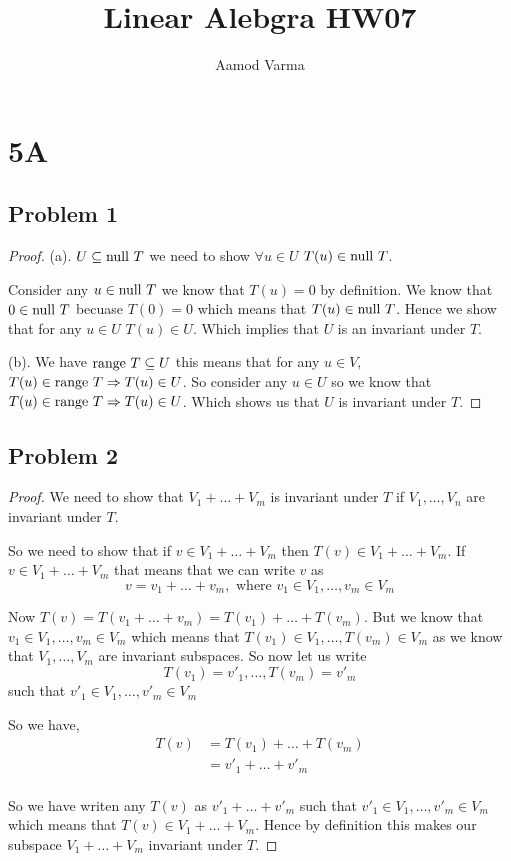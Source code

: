 \documentclass[a4paper]{report}
\title{Linear Alebgra HW07}
\author{Aamod Varma}
\begin{document}
\maketitle
\date{}

\section*{5A}
\subsection*{Problem 1}
\begin{proof}
   
(a). $U \subseteq \text{null } T$ we need to show $\forall u \in U$ $T(u) \in \text{null } T$.

Consider any $u \in \text{null } T$ we know that $T(u) = 0$ by definition. We know that $0 \in \text{null } T$ becuase $T(0) = 0$ which means that $T(u) \in \text{null } T$. Hence we show that for any $u \in U$ $T(u) \in U$. Which implies that  $U$ is an invariant under $T$.

\vspace{1em}
(b). We have $\text{range } T \subseteq U$ this means  that for any $u \in V,$ $T(u) \in \text{range } T \Rightarrow T(u) \in U$. So consider any $u \in U$ so we know that $T(u) \in \text{range } T \Rightarrow T(u) \in U$. Which shows us that $U$ is invariant under $T$.


\end{proof}

\subsection*{Problem 2}
\begin{proof}
   
We need to show that $V_1 + \dots +  V_m$ is invariant under $T$ if $V_1,\dots,V_n$ are invariant under $T$. 

So we need to show that if  $v \in V_1 + \dots + V_m$ then $T(v) \in V_1 + \dots + V_m$. If $v \in V_1 + \dots + V_m$ that means that we can write $v$ as 
$$ v = v_1 + \dots + v_m, \text{ where } v_1 \in V_1,\dots , v_m \in V_m $$ 

Now $T(v) = T(v_1 + \dots + v_m) = T(v_1) + \dots + T(v_m)$. But we know that $v_1 \in V_1,\dots ,v_m \in V_m$ which means that $T(v_1) \in V_1,\dots,T(v_m) \in V_m$ as we know that $V_1,\dots,V_m$ are invariant subspaces. So now let us write $$T(v_1) = v'_1 ,\dots , T(v_m) = v'_m$$ such that $v'_1 \in V_1,\dots,v'_m \in V_m$

So we have,
\begin{align*}
   T(v) &= T(v_1) + \dots + T(v_m) \\
   &= v'_1 + \dots + v'_m\\
\end{align*}

So we have writen any $T(v)$ as $v'_1 + \dots + v'_m$ such that  $v'_1 \in V_1,\dots,v'_m \in V_m$ which means that $T(v) \in V_1 + \dots + V_m$.  Hence by definition this makes our subspace $V_1 + \dots + V_m$ invariant under $T$.

\end{proof}
\end{document}
